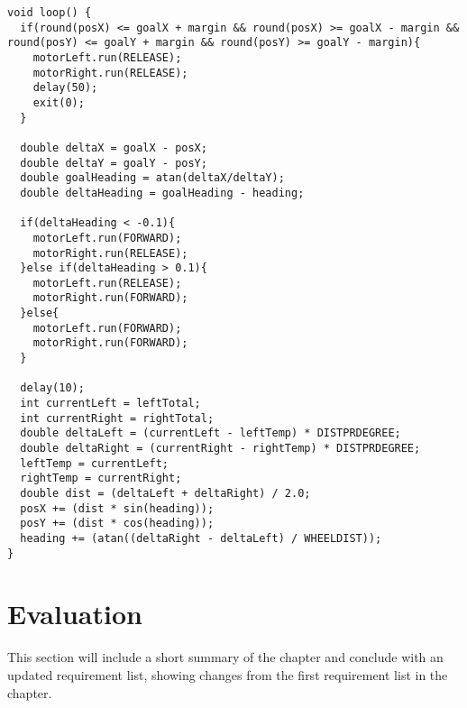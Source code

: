 \begin{lstlisting}[caption={The loop function}, label={loop}]
void loop() {
  if(round(posX) <= goalX + margin && round(posX) >= goalX - margin &&     round(posY) <= goalY + margin && round(posY) >= goalY - margin){
    motorLeft.run(RELEASE);
    motorRight.run(RELEASE);
    delay(50);
    exit(0);
  }
  
  double deltaX = goalX - posX;
  double deltaY = goalY - posY;
  double goalHeading = atan(deltaX/deltaY);
  double deltaHeading = goalHeading - heading;

  if(deltaHeading < -0.1){
    motorLeft.run(FORWARD);
    motorRight.run(RELEASE);
  }else if(deltaHeading > 0.1){
    motorLeft.run(RELEASE);
    motorRight.run(FORWARD);
  }else{
    motorLeft.run(FORWARD);
    motorRight.run(FORWARD);
  }
  
  delay(10);
  int currentLeft = leftTotal;
  int currentRight = rightTotal;
  double deltaLeft = (currentLeft - leftTemp) * DISTPRDEGREE;
  double deltaRight = (currentRight - rightTemp) * DISTPRDEGREE;
  leftTemp = currentLeft;
  rightTemp = currentRight;
  double dist = (deltaLeft + deltaRight) / 2.0;
  posX += (dist * sin(heading));
  posY += (dist * cos(heading));
  heading += (atan((deltaRight - deltaLeft) / WHEELDIST));
}
\end{lstlisting}



\section{Evaluation}
\label{sec:i2Evaluation}
This section will include a short summary of the chapter and conclude with an updated requirement list, showing changes from the first requirement list in the chapter. 